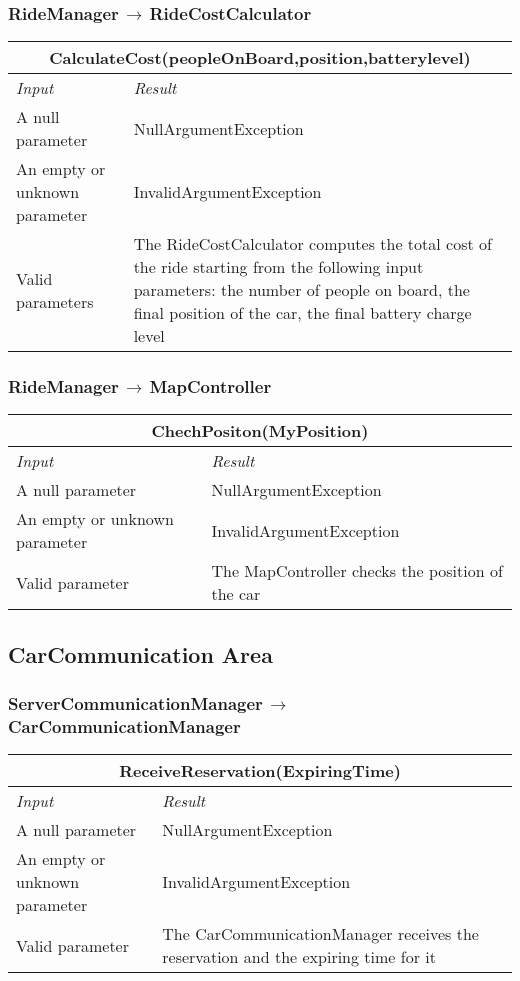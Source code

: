 \documentclass[11pt,a4paper]{report}
\begin{document}
\subsubsection{RideManager$\,\to\,$RideCostCalculator}
\begin{tabularx}{\textwidth}{|X|X|}
	\hline
	\multicolumn{2}{|c|}{\textbf{CalculateCost(peopleOnBoard,position,batterylevel)}}\\
	\hline
	\textit{Input} & \textit{Result}\\
	\hline
	A null parameter & NullArgumentException\\
	\hline
	An empty or unknown parameter & InvalidArgumentException\\
	\hline
	Valid parameters & The RideCostCalculator computes the total cost of the ride starting from the following input parameters: the number of people on board, the final position of the car, the final battery charge level\\
	\hline
\end{tabularx}
\subsubsection{RideManager$\,\to\,$MapController}
\begin{tabularx}{\textwidth}{|X|X|}
	\hline
	\multicolumn{2}{|c|}{\textbf{ChechPositon(MyPosition)}}\\
	\hline
	\textit{Input} & \textit{Result}\\
	\hline
	A null parameter & NullArgumentException\\
	\hline
	An empty or unknown parameter & InvalidArgumentException\\
	\hline
	Valid parameter &  The MapController checks the position of the car\\
	\hline
\end{tabularx}
\subsection{CarCommunication Area}
\subsubsection{ServerCommunicationManager$\,\to\,$CarCommunicationManager}
\begin{tabularx}{\textwidth}{|X|X|}
	\hline
	\multicolumn{2}{|c|}{\textbf{ReceiveReservation(ExpiringTime)}}\\
	\hline
	\textit{Input} & \textit{Result}\\
	\hline
	A null parameter & NullArgumentException\\
	\hline
	An empty or unknown parameter & InvalidArgumentException\\
	\hline
	Valid parameter &  The CarCommunicationManager receives the reservation and the expiring time for it\\
	\hline
\end{tabularx}
\end{document}
